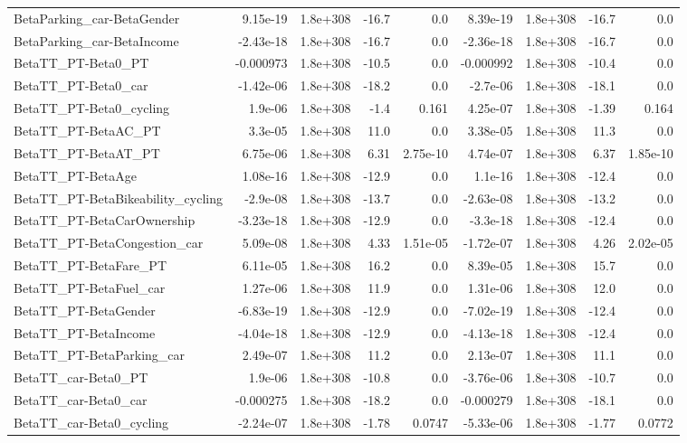 \begin{tabular}{lrrrrrrrr}
BetaParking_car-BetaGender & 9.15e-19 & 1.8e+308 & -16.7 & 0.0 & 8.39e-19 & 1.8e+308 & -16.7 & 0.0 \\
BetaParking_car-BetaIncome & -2.43e-18 & 1.8e+308 & -16.7 & 0.0 & -2.36e-18 & 1.8e+308 & -16.7 & 0.0 \\
BetaTT_PT-Beta0_PT & -0.000973 & 1.8e+308 & -10.5 & 0.0 & -0.000992 & 1.8e+308 & -10.4 & 0.0 \\
BetaTT_PT-Beta0_car & -1.42e-06 & 1.8e+308 & -18.2 & 0.0 & -2.7e-06 & 1.8e+308 & -18.1 & 0.0 \\
BetaTT_PT-Beta0_cycling & 1.9e-06 & 1.8e+308 & -1.4 & 0.161 & 4.25e-07 & 1.8e+308 & -1.39 & 0.164 \\
BetaTT_PT-BetaAC_PT & 3.3e-05 & 1.8e+308 & 11.0 & 0.0 & 3.38e-05 & 1.8e+308 & 11.3 & 0.0 \\
BetaTT_PT-BetaAT_PT & 6.75e-06 & 1.8e+308 & 6.31 & 2.75e-10 & 4.74e-07 & 1.8e+308 & 6.37 & 1.85e-10 \\
BetaTT_PT-BetaAge & 1.08e-16 & 1.8e+308 & -12.9 & 0.0 & 1.1e-16 & 1.8e+308 & -12.4 & 0.0 \\
BetaTT_PT-BetaBikeability_cycling & -2.9e-08 & 1.8e+308 & -13.7 & 0.0 & -2.63e-08 & 1.8e+308 & -13.2 & 0.0 \\
BetaTT_PT-BetaCarOwnership & -3.23e-18 & 1.8e+308 & -12.9 & 0.0 & -3.3e-18 & 1.8e+308 & -12.4 & 0.0 \\
BetaTT_PT-BetaCongestion_car & 5.09e-08 & 1.8e+308 & 4.33 & 1.51e-05 & -1.72e-07 & 1.8e+308 & 4.26 & 2.02e-05 \\
BetaTT_PT-BetaFare_PT & 6.11e-05 & 1.8e+308 & 16.2 & 0.0 & 8.39e-05 & 1.8e+308 & 15.7 & 0.0 \\
BetaTT_PT-BetaFuel_car & 1.27e-06 & 1.8e+308 & 11.9 & 0.0 & 1.31e-06 & 1.8e+308 & 12.0 & 0.0 \\
BetaTT_PT-BetaGender & -6.83e-19 & 1.8e+308 & -12.9 & 0.0 & -7.02e-19 & 1.8e+308 & -12.4 & 0.0 \\
BetaTT_PT-BetaIncome & -4.04e-18 & 1.8e+308 & -12.9 & 0.0 & -4.13e-18 & 1.8e+308 & -12.4 & 0.0 \\
BetaTT_PT-BetaParking_car & 2.49e-07 & 1.8e+308 & 11.2 & 0.0 & 2.13e-07 & 1.8e+308 & 11.1 & 0.0 \\
BetaTT_car-Beta0_PT & 1.9e-06 & 1.8e+308 & -10.8 & 0.0 & -3.76e-06 & 1.8e+308 & -10.7 & 0.0 \\
BetaTT_car-Beta0_car & -0.000275 & 1.8e+308 & -18.2 & 0.0 & -0.000279 & 1.8e+308 & -18.1 & 0.0 \\
BetaTT_car-Beta0_cycling & -2.24e-07 & 1.8e+308 & -1.78 & 0.0747 & -5.33e-06 & 1.8e+308 & -1.77 & 0.0772 \\

\end{tabular}
